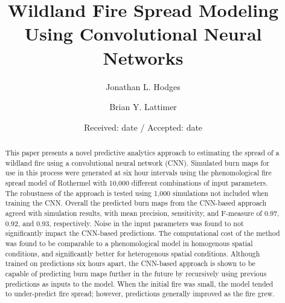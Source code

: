 \documentclass[smallcondensed]{svjour3}     %
\begin{document}
\title{Wildland Fire Spread Modeling Using Convolutional Neural Networks
}
\author{Jonathan L. Hodges         \and
        Brian Y. Lattimer
}

\date{Received: date / Accepted: date}


\maketitle

\begin{abstract}
This paper presents a novel predictive analytics approach to estimating
the spread of a wildland fire using a convolutional neural network
(CNN). Simulated burn maps for use in this process were
generated at six hour intervals using the phenomological fire spread model
of Rothermel with 10,000 different combinations of input parameters.
The robustness of the approach is tested using 1,000 simulations not
included when training the CNN. Overall the predicted burn maps 
from the CNN-based approach agreed with simulation results,
with mean precision, sensitivity, and F-measure of 0.97, 0.92, and 0.93,
respectively. Noise in the input parameters was found to not significantly
impact the CNN-based predictions. The computational cost of the method
was found to be comparable to a phenomological model in homogenous spatial
conditions, and significantly better for heterogenous spatial conditions.
Although trained on predictions six hours apart, the
CNN-based approach is shown to be capable of predicting burn maps
further in the future by recursively using previous predictions as inputs to
the model. When the initial fire was small, the model tended to under-predict
fire spread; however, predictions generally improved as the fire grew.

\end{abstract}
\end{document}
